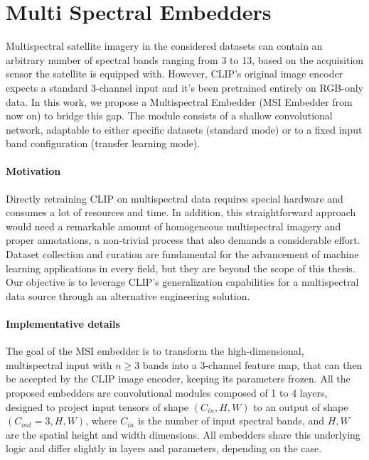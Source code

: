\documentclass[a4paper, twoside, english]{sapthesis} %
\begin{document}
\section{Multi Spectral Embedders}

Multispectral satellite imagery in the considered datasets can contain an arbitrary number of spectral bands ranging from 3 to 13, based on the acquisition sensor the satellite is equipped with. However, CLIP’s original image encoder expects a standard 3-channel input and it's been pretrained entirely on RGB-only data. In this work, we propose a Multispectral Embedder (MSI Embedder from now on) to bridge this gap. The module consists of a shallow convolutional network, adaptable to either specific datasets (standard mode) or to a fixed input band configuration (transfer learning mode).

\paragraph{Motivation} Directly retraining CLIP on multispectral data requires special hardware and consumes a lot of resources and time. In addition, this straightforward approach would need a remarkable amount of homogeneous multispectral imagery and proper annotations, a non-trivial process that also demands a considerable effort. Dataset collection and curation are fundamental for the advancement of machine learning applications in every field, but they are beyond the scope of this thesis. Our objective is to leverage CLIP’s generalization capabilities for a multispectral data source through an alternative engineering solution.

\paragraph{Implementative details} The goal of the MSI embedder is to transform the high-dimensional, multispectral input with $n \ge 3$ bands into a $3$-channel feature map, that can then be accepted by the CLIP image encoder, keeping its parameters frozen. 
All the proposed embedders are convolutional modules composed of 1 to 4 layers, designed to project input tensors of shape $(C_{in}, H, W)$ to an output of shape $(C_{out} = 3, H, W)$, where $C_{in}$ is the number of input spectral bands, and $H, W$ are the spatial height and width dimensions. All embedders share this underlying logic and differ slightly in layers and parameters, depending on the case.
\end{document}
